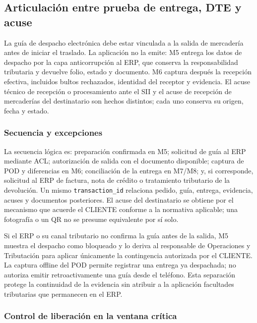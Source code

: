 \subsection{Articulación entre prueba de entrega, DTE y acuse}
\label{sec:pod-dte-acuse}

La guía de despacho electrónica debe estar vinculada a la salida de mercadería antes de iniciar el traslado. La aplicación no la emite: M5 entrega los datos de despacho por la capa anticorrupción al ERP, que conserva la responsabilidad tributaria y devuelve folio, estado y documento. M6 captura después la recepción efectiva, incluidos bultos rechazados, identidad del receptor y evidencia. El acuse técnico de recepción o procesamiento ante el SII y el acuse de recepción de mercaderías del destinatario son hechos distintos; cada uno conserva su origen, fecha y estado.

\subsubsection{Secuencia y excepciones}

La secuencia lógica es: preparación confirmada en M5; solicitud de guía al ERP mediante ACL; autorización de salida con el documento disponible; captura de POD y diferencias en M6; conciliación de la entrega en M7/M8; y, si corresponde, solicitud al ERP de factura, nota de crédito o tratamiento tributario de la devolución. Un mismo \texttt{transaction\_id} relaciona pedido, guía, entrega, evidencia, acuses y documentos posteriores. El acuse del destinatario se obtiene por el mecanismo que acuerde el CLIENTE conforme a la normativa aplicable; una fotografía o un QR no se presume equivalente por sí solo.

Si el ERP o su canal tributario no confirma la guía antes de la salida, M5 muestra el despacho como bloqueado y lo deriva al responsable de Operaciones y Tributación para aplicar únicamente la contingencia autorizada por el CLIENTE. La captura offline del POD permite registrar una entrega ya despachada; no autoriza emitir retroactivamente una guía desde el teléfono. Esta separación protege la continuidad de la evidencia sin atribuir a la aplicación facultades tributarias que permanecen en el ERP.

\subsubsection{Control de liberación en la ventana crítica}

